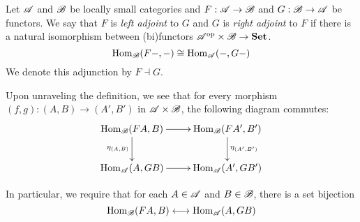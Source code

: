 \begin{definition}
    Let $\mathscr{A}$ and $\mathscr{B}$ be locally small categories and $F: \mathscr{A}\to\mathscr{B}$ and $G:\mathscr{B}\to\mathscr{A}$ be functors. We say that $F$ is \textit{left adjoint} to $G$ and $G$ is \textit{right adjoint} to $F$ if there is a natural isomorphism between (bi)functors $\mathscr{A}^{\text{op}}\times\mathscr{B}\to\mathbf{Set}$.
    \begin{equation*}
        \operatorname{Hom}_{\mathscr{B}}(F-,-)\cong\operatorname{Hom}_{\mathscr{A}}(-,G-)
    \end{equation*}
    We denote this adjunction by $F\dashv G$.
\end{definition}

Upon unraveling the definition, we see that for every morphism $(f,g): (A,B)\to(A',B')$ in $\mathscr{A}\times\mathscr{B}$, the following diagram commutes: 
\begin{equation*}
    \xymatrix{
    \Hom_{\B}(FA,B)\ar[r]\ar[d]_{\eta_{(A,B)}} & \Hom_{\B}(FA',B')\ar[d]^{\eta_{(A',B')}}\\
    \Hom_{\A}(A,GB)\ar[r] & \Hom_{\A}(A',GB')\\
    }
\end{equation*}

In particular, we require that for each $A\in\mathscr{A}$ and $B\in\mathscr{B}$, there is a set bijection 
\begin{equation*}
    \operatorname{Hom}_{\mathscr{B}}(FA,B)\longleftrightarrow\operatorname{Hom}_{\mathscr{A}}(A,GB)
\end{equation*}